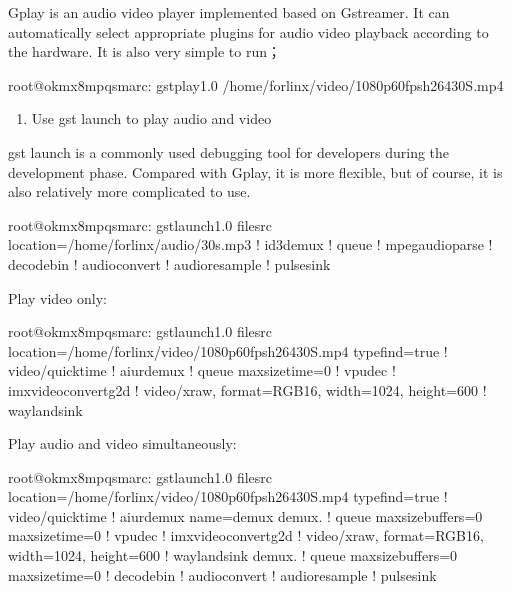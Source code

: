\documentclass[letterpaper,10pt,openany,english]{sphinxmanual}
\begin{document}
\sphinxAtStartPar
Gplay is an audio \sphinxhyphen{} video player implemented based on Gstreamer. It can automatically select appropriate plugins for audio \sphinxhyphen{} video playback according to the hardware. It is also very simple to run；

\begin{sphinxVerbatim}[commandchars=\\\{\}]
root@ok\PYGZhy{}mx8mpq\PYGZhy{}smarc:\PYGZti{}\PYGZsh{} gst\PYGZhy{}play\PYGZhy{}1.0 /home/forlinx/video/1080p\PYGZus{}60fps\PYGZus{}h264\PYGZhy{}30S.mp4
\end{sphinxVerbatim}
\begin{enumerate}
%
\setcounter{enumi}{1}
\item {} 
\sphinxAtStartPar
Use gst \sphinxhyphen{} launch to play audio and video

\end{enumerate}

\sphinxAtStartPar
gst \sphinxhyphen{} launch is a commonly used debugging tool for developers during the development phase. Compared with Gplay, it is more flexible, but of course, it is also relatively more complicated to use.

\begin{sphinxVerbatim}[commandchars=\\\{\}]
root@ok\PYGZhy{}mx8mpq\PYGZhy{}smarc:\PYGZti{}\PYGZsh{} gst\PYGZhy{}launch\PYGZhy{}1.0 filesrc location=/home/forlinx/audio/30s.mp3 ! id3demux ! queue ! mpegaudioparse ! decodebin ! audioconvert ! audioresample ! pulsesink
\end{sphinxVerbatim}

\sphinxAtStartPar
Play video only:

\begin{sphinxVerbatim}[commandchars=\\\{\}]
root@ok\PYGZhy{}mx8mpq\PYGZhy{}smarc:\PYGZti{}\PYGZsh{} gst\PYGZhy{}launch\PYGZhy{}1.0 filesrc location=/home/forlinx/video/1080p\PYGZus{}60fps\PYGZus{}h264\PYGZhy{}30S.mp4 typefind=true ! video/quicktime ! aiurdemux ! queue max\PYGZhy{}size\PYGZhy{}time=0 ! vpudec ! imxvideoconvert\PYGZus{}g2d ! video/x\PYGZhy{}raw, format=RGB16, width=1024, height=600 ! waylandsink
\end{sphinxVerbatim}

\sphinxAtStartPar
Play audio and video simultaneously:

\begin{sphinxVerbatim}[commandchars=\\\{\}]
root@ok\PYGZhy{}mx8mpq\PYGZhy{}smarc:\PYGZti{}\PYGZsh{} gst\PYGZhy{}launch\PYGZhy{}1.0 filesrc location=/home/forlinx/video/1080p\PYGZus{}60fps\PYGZus{}h264\PYGZhy{}30S.mp4 typefind=true ! video/quicktime ! aiurdemux name=demux demux. ! queue max\PYGZhy{}size\PYGZhy{}buffers=0 max\PYGZhy{}size\PYGZhy{}time=0 ! vpudec !  imxvideoconvert\PYGZus{}g2d ! video/x\PYGZhy{}raw, format=RGB16, width=1024, height=600 ! waylandsink demux. ! queue max\PYGZhy{}size\PYGZhy{}buffers=0 max\PYGZhy{}size\PYGZhy{}time=0 ! decodebin ! audioconvert ! audioresample ! pulsesink
\end{sphinxVerbatim}
\end{document}
